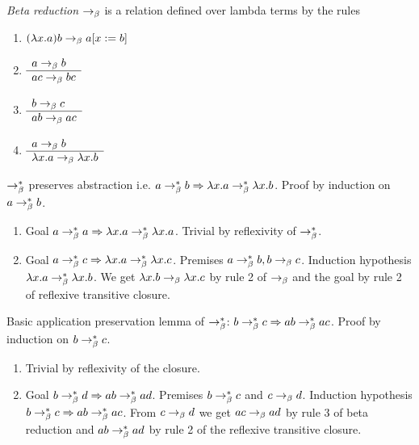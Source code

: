 \documentclass{article}
\begin{document}
\begin{definition} \emph{Beta reduction} $\to_\beta$ is a relation defined over lambda
  terms by the rules
  \begin{enumerate}
  \item $(\lambda x.a) b \to_\beta a[x := b]$
  \item $\begin{array}{l} a\to_\beta b \\ \hline a c \to_\beta b c\end{array}$
  \item $\begin{array}{l} b\to_\beta c \\ \hline a b \to_\beta a c\end{array}$
  \item $\begin{array}{l} a \to_\beta b \\ \hline \lambda x.a \to_\beta \lambda x.b\end{array}$
  \end{enumerate}
\end{definition}




\begin{theorem}
  $\to^*_\beta$ preserves abstraction
  i.e. $a \to^*_\beta b \Rightarrow \lambda x.a \to^*_\beta \lambda x.b$.
  Proof by induction on $a \to^*_\beta b$.
  \begin{enumerate}
  \item Goal $a \to^*_\beta a \Rightarrow \lambda x.a \to^*_\beta \lambda
    x.a$. Trivial by reflexivity of $\to^*_\beta$.
    \item
      Goal $a \to^*_\beta c \Rightarrow \lambda x.a \to^*_\beta \lambda x.c$.
      Premises $a \to^*_\beta b, b \to_\beta c$.
      Induction hypothesis $\lambda x.a \to^*_\beta \lambda x.b$.
      We get $\lambda x.b \to_\beta \lambda x.c$ by rule 2 of $\to_\beta$ and
      the goal by rule 2 of reflexive transitive closure.
  \end{enumerate}
\end{theorem}


\begin{lemma}
  Basic application preservation lemma of $\to^*_\beta$:
  $b \to^*_\beta c  \Rightarrow a b \to^*_\beta a c$.
  Proof by induction on $b \to^*_\beta c$.
  \begin{enumerate}
  \item
    Trivial by reflexivity of the closure.
  \item
    Goal $b \to^*_\beta d  \Rightarrow a b \to^*_\beta a d$.
    Premises $b \to^*_\beta c$ and $c \to_\beta d$.
    Induction hypothesis $b \to^*_\beta c  \Rightarrow a b \to^*_\beta a c$.
    From $c \to_\beta d$ we get $a c \to_\beta a d$ by rule 3 of beta reduction
    and $a b \to^*_\beta a d$ by rule 2 of the reflexive transitive closure.
  \end{enumerate}
\end{lemma}
\end{document}
